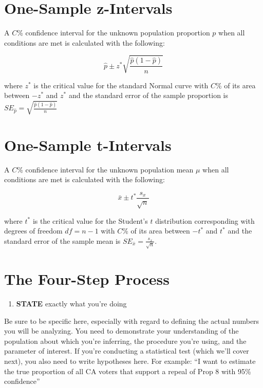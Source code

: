 \documentclass[
]{book}
\providecommand{\tightlist}{%
  \setlength{\itemsep}{0pt}\setlength{\parskip}{0pt}}
\begin{document}
\hypertarget{one-sample-z-intervals}{%
\section{One-Sample z-Intervals}\label{one-sample-z-intervals}}

A \(C\)\% confidence interval for the unknown population proportion \(p\) when all conditions are met is calculated with the following:

\[\hat p \pm z^* \sqrt{\frac{\hat p (1 - \hat p)}{n}}\]

where \(z^*\) is the critical value for the standard Normal curve with \(C\)\% of its area between \(-z^*\) and \(z^*\) and the standard error of the sample proportion is \(SE_{\hat p}=\sqrt{\frac{\hat p (1 - \hat p)}{n}}\)

\hypertarget{one-sample-t-intervals}{%
\section{One-Sample t-Intervals}\label{one-sample-t-intervals}}

A \(C\)\% confidence interval for the unknown population mean \(\mu\) when all conditions are met is calculated with the following:

\[\bar x \pm t^* \frac{s_x}{\sqrt{n}}\]

where \(t^*\) is the critical value for the Student's \(t\) distribution corresponding with degrees of freedom \(df = n - 1\) with \(C\)\% of its area between \(-t^*\) and \(t^*\) and the standard error of the sample mean is \(SE_{\bar x}=\frac{s_x}{\sqrt{n}}\).

\hypertarget{the-four-step-process}{%
\section{The Four-Step Process}\label{the-four-step-process}}

\begin{enumerate}
\def\labelenumi{\arabic{enumi}.}
\tightlist
\item
  \textbf{STATE} exactly what you're doing
\end{enumerate}

Be sure to be specific here, especially with regard to defining the actual numbers you will be analyzing. You need to demonstrate your understanding of the population about which you're inferring, the procedure you're using, and the parameter of interest. If you're conducting a statistical test (which we'll cover next), you also need to write hypotheses here. For example: ``I want to estimate the true proportion of all CA voters that support a repeal of Prop 8 with 95\% confidence''
\end{document}
